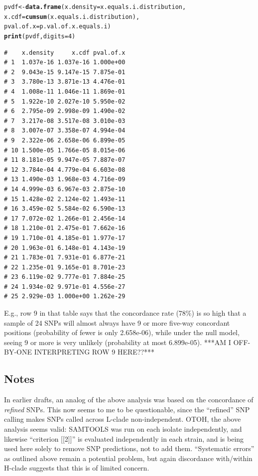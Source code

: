 \documentclass{article}\usepackage[]{graphicx}\usepackage[]{color}
\makeatletter
\newcommand{\hlnum}[1]{\textcolor[rgb]{0.686,0.059,0.569}{#1}}%
\newcommand{\hlstd}[1]{\textcolor[rgb]{0.345,0.345,0.345}{#1}}%
\newcommand{\hlkwb}[1]{\textcolor[rgb]{0.69,0.353,0.396}{#1}}%
\newcommand{\hlkwc}[1]{\textcolor[rgb]{0.333,0.667,0.333}{#1}}%
\newcommand{\hlkwd}[1]{\textcolor[rgb]{0.737,0.353,0.396}{\textbf{#1}}}%
\newenvironment{kframe}{%
 \def\at@end@of@kframe{}%
 \ifinner\ifhmode%
  \def\at@end@of@kframe{\end{minipage}}%
  \begin{minipage}{\columnwidth}%
 \fi\fi%
 \def\FrameCommand##1{\hskip\@totalleftmargin \hskip-\fboxsep
 \colorbox{shadecolor}{##1}\hskip-\fboxsep
     \hskip-\linewidth \hskip-\@totalleftmargin \hskip\columnwidth}%
 \MakeFramed {\advance\hsize-\width
   \@totalleftmargin\z@ \linewidth\hsize
   \@setminipage}}%
 {\par\unskip\endMakeFramed%
 \at@end@of@kframe}
\newenvironment{knitrout}{}{} %
\makeatother
\begin{document}
\begin{enumerate}
\begin{knitrout}\footnotesize
{}\color{fgcolor}\begin{kframe}
\begin{alltt}
\hlstd{pvdf} \hlkwb{<-} \hlkwd{data.frame}\hlstd{(}\hlkwc{x.density}\hlstd{=x.equals.i.distribution,}
                   \hlkwc{x.cdf}\hlstd{=}\hlkwd{cumsum}\hlstd{(x.equals.i.distribution),}
                   \hlkwc{pval.of.x}\hlstd{=p.val.of.x.equals.i)}
\hlkwd{print}\hlstd{(pvdf,} \hlkwc{digits}\hlstd{=}\hlnum{4}\hlstd{)}
\end{alltt}
\begin{verbatim}
#    x.density     x.cdf pval.of.x
# 1  1.037e-16 1.037e-16 1.000e+00
# 2  9.043e-15 9.147e-15 7.875e-01
# 3  3.780e-13 3.871e-13 4.476e-01
# 4  1.008e-11 1.046e-11 1.869e-01
# 5  1.922e-10 2.027e-10 5.950e-02
# 6  2.795e-09 2.998e-09 1.490e-02
# 7  3.217e-08 3.517e-08 3.010e-03
# 8  3.007e-07 3.358e-07 4.994e-04
# 9  2.322e-06 2.658e-06 6.899e-05
# 10 1.500e-05 1.766e-05 8.015e-06
# 11 8.181e-05 9.947e-05 7.887e-07
# 12 3.784e-04 4.779e-04 6.603e-08
# 13 1.490e-03 1.968e-03 4.716e-09
# 14 4.999e-03 6.967e-03 2.875e-10
# 15 1.428e-02 2.124e-02 1.493e-11
# 16 3.459e-02 5.584e-02 6.590e-13
# 17 7.072e-02 1.266e-01 2.456e-14
# 18 1.210e-01 2.475e-01 7.662e-16
# 19 1.710e-01 4.185e-01 1.977e-17
# 20 1.963e-01 6.148e-01 4.143e-19
# 21 1.783e-01 7.931e-01 6.877e-21
# 22 1.235e-01 9.165e-01 8.701e-23
# 23 6.119e-02 9.777e-01 7.884e-25
# 24 1.934e-02 9.971e-01 4.556e-27
# 25 2.929e-03 1.000e+00 1.262e-29
\end{verbatim}
\end{kframe}
\end{knitrout}

E.g., row 9 in that table says that the concordance rate (78\%) is so high that a sample of 24 SNPs will almost always have 9 or more five-way concordant positions (probability of fewer is only 2.658e-06), while under the null model, seeing 9 or more is very unlikely (probability at most 6.899e-05).  
***AM I OFF-BY-ONE INTERPRETING ROW 9 HERE??***  

\end{enumerate}

\subsection{Notes}

In earlier drafts, an analog of the above analysis was based on the concordance of \emph{refined} SNPs.  This now seems to me to be questionable, since the ``refined'' SNP calling makes SNPs called across L-clade non-independent. OTOH, the above analysis seems valid: SAMTOOLS was run on each isolate independently, and likewise ``criterion [[2]]'' is evaluated independently in each strain, and is being used here solely to remove SNP predictions, not to add them.  ``Systematic errors'' as outlined above remain a potential problem, but again discordance with/within H-clade suggests that this is of limited concern.
\end{document}
